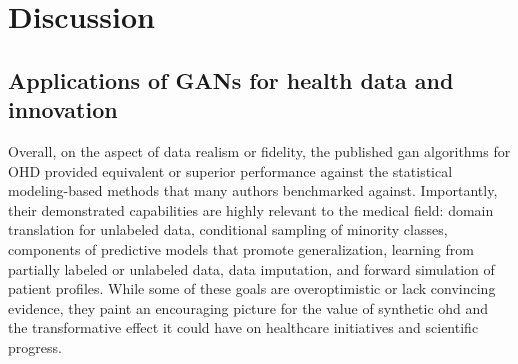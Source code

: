 \section{Discussion}
\subsection{Applications of GANs for health data and innovation}

Overall, on the aspect of data realism or fidelity, the published \gls{gan} algorithms for OHD provided equivalent or superior performance against the statistical modeling-based methods that many authors benchmarked against. Importantly, their demonstrated capabilities are highly relevant to the medical field: domain translation for unlabeled data, conditional sampling of minority classes, components of predictive models that promote generalization, learning from partially labeled or unlabeled data, data imputation, and forward simulation of patient profiles. While some of these goals are overoptimistic or lack convincing evidence, they paint an encouraging picture for the value of synthetic \gls{ohd} and the transformative effect it could have on healthcare initiatives and scientific progress.

